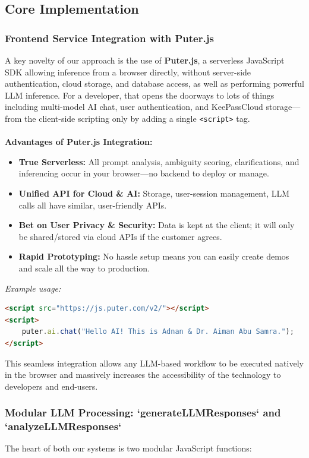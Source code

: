 \documentclass[11pt,a4paper]{article}
\begin{document}
\subsection{Core Implementation}

\subsubsection{Frontend Service Integration with Puter.js}
A key novelty of our approach is the use of \textbf{Puter.js}, a serverless JavaScript SDK allowing inference from a browser directly, without server-side authentication, cloud storage, and database access, as well as performing powerful LLM inference. For a developer, that opens the doorways to lots of things including multi-model AI chat, user authentication, and KeePassCloud storage—from the client-side scripting only by adding a single \texttt{<script>} tag.
\\
\\
\textbf{Advantages of Puter.js Integration:}
\begin{itemize}
    \item \textbf{True Serverless:} All prompt analysis, ambiguity scoring, clarifications, and inferencing occur in your browser—no backend to deploy or manage.
    \item \textbf{Unified API for Cloud \& AI:} Storage, user-session management, LLM calls all have similar, user-friendly APIs.
    \item \textbf{Bet on User Privacy \& Security:} Data is kept at the client; it will only be shared/stored via cloud APIs if the customer agrees.
    \item \textbf{Rapid Prototyping:} No hassle setup means you can easily create demos and scale all the way to production.
\end{itemize}

\textit{Example usage:}

\begin{lstlisting}[language=HTML]
<script src="https://js.puter.com/v2/"></script>
<script>
    puter.ai.chat("Hello AI! This is Adnan & Dr. Aiman Abu Samra.");
</script>
\end{lstlisting}

This seamless integration allows any LLM-based workflow to be executed natively in the browser and massively increases the accessibility of the technology to developers and end-users.

\subsubsection{Modular LLM Processing: `generateLLMResponses` and `analyzeLLMResponses`}
The heart of both our systems is two modular JavaScript functions:
\end{document}
